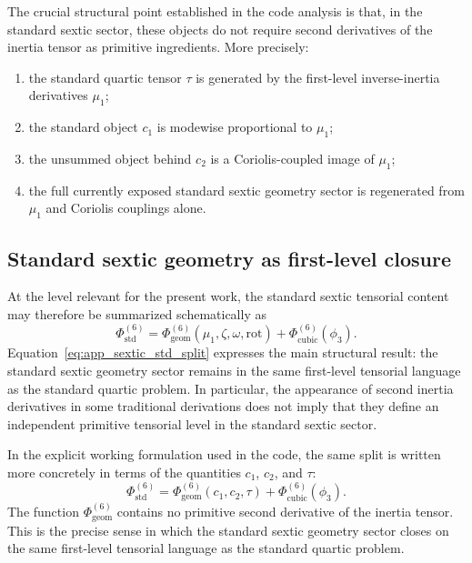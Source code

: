 The crucial structural point established in the code analysis is that, in the
standard sextic sector, these objects do not require second derivatives of the
inertia tensor as primitive ingredients. More precisely:
\begin{enumerate}
\item the standard quartic tensor $\tau$ is generated by the first-level
inverse-inertia derivatives $\mu_1$;
\item the standard object $c_1$ is modewise proportional to $\mu_1$;
\item the unsummed object behind $c_2$ is a Coriolis-coupled image of $\mu_1$;
\item the full currently exposed standard sextic geometry sector is regenerated
from $\mu_1$ and Coriolis couplings alone.
\end{enumerate}

\subsection{Standard sextic geometry as first-level closure}

At the level relevant for the present work, the standard sextic tensorial
content may therefore be summarized schematically as
\begin{equation}
\Phi^{(6)}_{\mathrm{std}}
=
\Phi^{(6)}_{\mathrm{geom}}(\mu_1,\zeta,\omega,\mathrm{rot})
+
\Phi^{(6)}_{\mathrm{cubic}}(\phi_3).
\label{eq:app_sextic_std_split}
\end{equation}
Equation~\eqref{eq:app_sextic_std_split} expresses the main structural result:
the standard sextic geometry sector remains in the same first-level tensorial
language as the standard quartic problem. In particular, the appearance of
second inertia derivatives in some traditional derivations does not imply that
they define an independent primitive tensorial level in the standard sextic
sector.

In the explicit working formulation used in the code, the same split is
written more concretely in terms of the quantities $c_1$, $c_2$, and $\tau$:
\begin{equation}
\Phi^{(6)}_{\mathrm{std}}
=
\Phi^{(6)}_{\mathrm{geom}}(c_1,c_2,\tau)
+
\Phi^{(6)}_{\mathrm{cubic}}(\phi_3).
\label{eq:app_sextic_std_split_c1c2}
\end{equation}
The function $\Phi^{(6)}_{\mathrm{geom}}$ contains no primitive second
derivative of the inertia tensor. This is the precise sense in which the
standard sextic geometry sector closes on the same first-level tensorial
language as the standard quartic problem.


